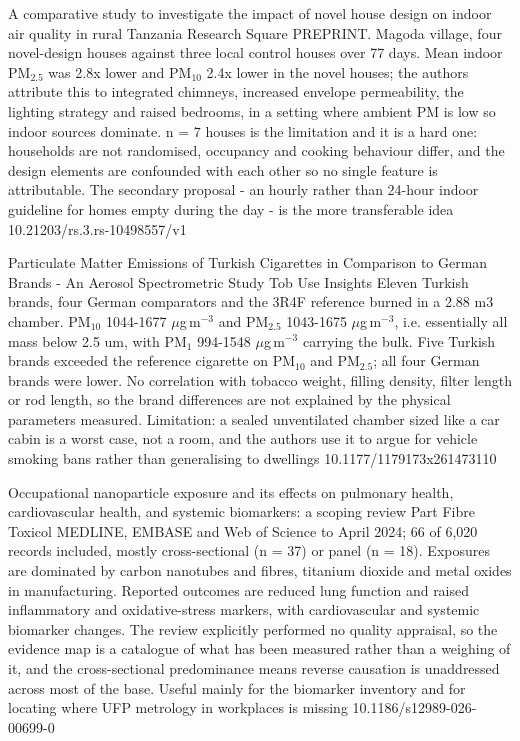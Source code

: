 \documentclass[10pt]{article}
\begin{document}
{A comparative study to investigate the impact of novel house design on indoor air quality in rural Tanzania}
{Research Square}
{PREPRINT. Magoda village, four novel-design houses against three local control houses over 77 days. Mean indoor PM$_{2.5}$ was 2.8x lower and PM$_{10}$ 2.4x lower in the novel houses; the authors attribute this to integrated chimneys, increased envelope permeability, the lighting strategy and raised bedrooms, in a setting where ambient PM is low so indoor sources dominate. n = 7 houses is the limitation and it is a hard one: households are not randomised, occupancy and cooking behaviour differ, and the design elements are confounded with each other so no single feature is attributable. The secondary proposal - an hourly rather than 24-hour indoor guideline for homes empty during the day - is the more transferable idea}
{10.21203/rs.3.rs-10498557/v1}

{Particulate Matter Emissions of Turkish Cigarettes in Comparison to German Brands - An Aerosol Spectrometric Study}
{Tob Use Insights}
{Eleven Turkish brands, four German comparators and the 3R4F reference burned in a 2.88 m3 chamber. PM$_{10}$ 1044-1677 $\mu$g\,m$^{-3}$ and PM$_{2.5}$ 1043-1675 $\mu$g\,m$^{-3}$, i.e. essentially all mass below 2.5 um, with PM$_{1}$ 994-1548 $\mu$g\,m$^{-3}$ carrying the bulk. Five Turkish brands exceeded the reference cigarette on PM$_{10}$ and PM$_{2.5}$; all four German brands were lower. No correlation with tobacco weight, filling density, filter length or rod length, so the brand differences are not explained by the physical parameters measured. Limitation: a sealed unventilated chamber sized like a car cabin is a worst case, not a room, and the authors use it to argue for vehicle smoking bans rather than generalising to dwellings}
{10.1177/1179173x261473110}

{Occupational nanoparticle exposure and its effects on pulmonary health, cardiovascular health, and systemic biomarkers: a scoping review}
{Part Fibre Toxicol}
{MEDLINE, EMBASE and Web of Science to April 2024; 66 of 6,020 records included, mostly cross-sectional (n = 37) or panel (n = 18). Exposures are dominated by carbon nanotubes and fibres, titanium dioxide and metal oxides in manufacturing. Reported outcomes are reduced lung function and raised inflammatory and oxidative-stress markers, with cardiovascular and systemic biomarker changes. The review explicitly performed no quality appraisal, so the evidence map is a catalogue of what has been measured rather than a weighing of it, and the cross-sectional predominance means reverse causation is unaddressed across most of the base. Useful mainly for the biomarker inventory and for locating where UFP metrology in workplaces is missing}
{10.1186/s12989-026-00699-0}
\end{document}
